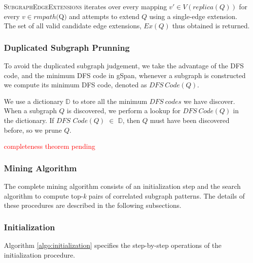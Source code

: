 \textsc{SubgraphEdgeExtensions} iterates over every mapping $v'\in
V(replica(Q))$ for every $v\in rmpath($Q$)$ and attempts to extend $Q$ using a
single-edge extension. The set of all valid candidate edge extensions, $Ex(Q)$ thus
obtained is returned.

\subsubsection{Duplicated Subgraph Prunning}
To avoid the duplicated subgraph judgement, we take the advantage of the DFS
code, and the minimum DFS code in gSpan\cite{YH02}, whenever a subgraph is
constructed we compute its minimum DFS code, denoted as $DFS\ Code(Q)$.

\par We use a dictionary $\mathbb{D}$ to store all the minimum $DFS\ codes$ we have
discover. When a subgraph $Q$ is discovered, we perform a lookup for $DFS\ Code(Q)$ in the
dictionary. If $DFS$ $Code(Q)$ $\in$ $\mathbb{D}$, then $Q$ must have been discovered before,
so we prune $Q$.

\textcolor{red}{completeness theorem pending}

\subsubsection{Mining Algorithm}
\label{subsec:miningalgo}
The complete mining algorithm consists of an initialization step and the search
algorithm to compute top-\textit{k} pairs of correlated subgraph patterns. The
details of these procedures are described in the following subsections.
\subsubsection{Initialization}
\label{subsec:initialization}
Algorithm \ref{algo:initialization} specifies the step-by-step operations of the
initialization procedure.

